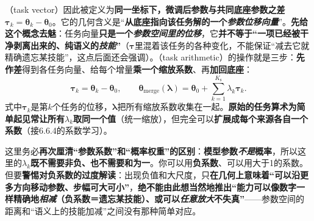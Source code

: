 （task vector）因此被定义为\textbf{同一坐标下，微调后参数与共同底座参数之差}$\bm{\tau}_k=\bm{\theta}_k-\bm{\theta}_0$。它的几何含义是“\textbf{从底座指向该任务解的一个\emph{参数位移向量}}”。\textbf{先给这个概念去魅}：任务向量\textbf{只是一个\emph{参数空间里的位移}}，它\textbf{并不等于“一项已经被干净剥离出来的、纯语义的\emph{技能}”}（$\bm{\tau}$里混着该任务的各种变化，不能保证“减去它就精确遗忘某技能”，这点后面还会强调）。（task arithmetic）的操作就是三步：\textbf{先作差}得到各任务向量、给每个增量\textbf{乘一个缩放系数}、再\textbf{加回底座}：
\begin{equation}
  \bm{\tau}_k=\bm{\theta}_k-\bm{\theta}_0,\qquad
  \bm{\theta}_{\mathrm{merge}}(\bm{\lambda})
    =\bm{\theta}_0+\sum_{k=1}^{K_{\mathrm{s}}}\lambda_k\bm{\tau}_k.
  \label{eq:ket-integration-task-arithmetic}
\end{equation}
式中$\bm{\tau}_k$是第$k$个任务的位移，$\bm{\lambda}$把所有缩放系数收集在一起。\textbf{原始的任务算术为简单起见常让所有$\lambda_k$取同一个值}（统一缩放），但完全可以\textbf{扩展成每个来源各自一个系数}（接6.6.4的系数学习）。

这里务必\textbf{再次厘清“参数系数”和“概率权重”的区别}：\textbf{模型参数\emph{不是}概率}，所以这里的$\lambda_k$\textbf{既不需要非负、也不需要和为一}。你可以用\textbf{负系数}、可以用大于1的系数。但要\textbf{警惕对负系数的过度解读}：出现负值和大尺度，只\textbf{在几何上意味着“可以沿更多方向移动参数、步幅可大可小”}，\textbf{绝不能由此想当然地推出“能力可以像数字一样精确地\emph{相减}（负系数＝遗忘某技能）、或可以\emph{任意放大}不失真”}——参数空间的距离和“语义上的技能加减”之间没有那种简单对应。

